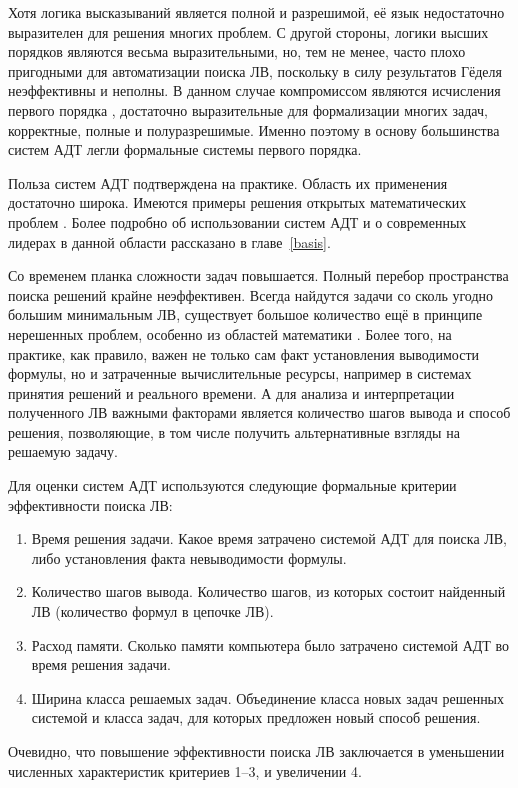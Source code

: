 Хотя логика высказываний является полной и разрешимой, её язык недостаточно выразителен для решения многих проблем. С другой стороны, логики высших порядков являются весьма выразительными, но, тем не менее, часто плохо пригодными для автоматизации поиска ЛВ, поскольку в силу результатов Гёделя неэффективны и неполны. В данном случае компромиссом являются исчисления первого порядка \cite{Frege, Sourcebook, mendelson}, достаточно выразительные для формализации многих задач, корректные, полные и полуразрешимые. Именно поэтому в основу большинства систем АДТ легли формальные системы первого порядка.

Польза систем АДТ подтверждена на практике. Область их применения достаточно широка. Имеются примеры решения открытых математических проблем \cite{McCuneRob}. Более подробно об использовании систем АДТ и о современных лидерах в данной области рассказано в главе~\ref{basis}.

Со временем планка сложности задач повышается. Полный перебор пространства поиска решений крайне неэффективен. Всегда найдутся задачи со сколь угодно большим минимальным ЛВ, существует большое количество ещё в принципе нерешенных проблем, особенно из областей математики \cite{tptp}. Более того, на практике, как правило, важен не только сам факт установления выводимости формулы, но и затраченные вычислительные ресурсы, например в системах принятия решений и реального времени. А для анализа и интерпретации полученного ЛВ важными факторами является количество шагов вывода и способ решения, позволяющие, в том числе получить альтернативные взгляды на решаемую задачу.

Для оценки систем АДТ используются следующие формальные критерии эффективности поиска ЛВ:
\label{pg:criterion}
\begin{enumerate}
\item{Время решения задачи.} Какое время затрачено системой АДТ для поиска ЛВ, либо установления факта невыводимости формулы.
\item{Количество шагов вывода.} Количество шагов, из которых состоит найденный ЛВ (количество формул в цепочке ЛВ).
\item{Расход памяти.} Сколько памяти компьютера было затрачено системой АДТ во время решения задачи.
\item{Ширина класса решаемых задач.} Объединение класса новых задач решенных системой и класса задач, для которых предложен новый способ решения.
\end{enumerate}
Очевидно, что повышение эффективности поиска ЛВ заключается в уменьшении численных характеристик критериев 1--3, и увеличении 4.

